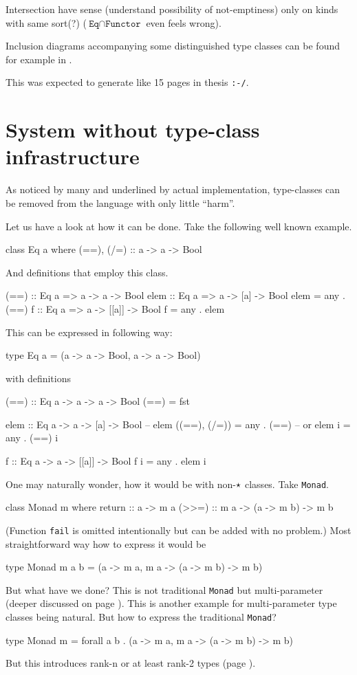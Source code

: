 \documentclass[11pt,oneside,draft]{fithesis2}
\newcommand\uv[1]{``#1''}
\theoremstyle{definition}
\begin{document}
Intersection have sense (understand possibility of not-emptiness) only on
kinds with same sort(?) (\(\texttt{Eq} \cap \texttt{Functor}\) even feels wrong).

Inclusion diagrams accompanying some distinguished type classes can be found for
example in \cite{typeclassopedia}.

This was expected to generate like 15 pages in thesis \verb~:-/~.

\section{System without type-class infrastructure}

As noticed by many and underlined by actual implementation, type-classes can be removed
from the language with only little \uv{harm}.

Let us have a look at how it can be done. Take the following well known example.
\begin{code}
class Eq a where
    (==), (/=) :: a -> a -> Bool
\end{code}
And definitions that employ this class.
\begin{code}
(==) :: Eq a => a -> a -> Bool
elem :: Eq a => a -> [a] -> Bool
elem = any . (==)
f :: Eq a => a -> [[a]] -> Bool
f = any . elem
\end{code}
This can be expressed in following way:
\begin{code}
type Eq a = (a -> a -> Bool, a -> a -> Bool)
\end{code}
with definitions
\begin{code}
(==) :: Eq a -> a -> a -> Bool
(==) = fst

elem :: Eq a -> a -> [a] -> Bool
-- elem ((==), (/=)) = any . (==)
-- or
elem i = any . (==) i

f :: Eq a -> a -> [[a]] -> Bool
f i = any . elem i
\end{code}

One may naturally wonder, how it would be with non-\(\star\) classes.
Take \texttt{Monad}.
\begin{code}
class Monad m where
	return :: a -> m a
	(>>=) :: m a -> (a -> m b) -> m b
\end{code}
(Function \texttt{fail} is omitted intentionally but can be added with
no problem.)
Most straightforward way how to express it would be
\begin{code}
type Monad m a b = (a -> m a, m a -> (a -> m b) -> m b)
\end{code}
But what have we done? This is not traditional \texttt{Monad}
but multi-parameter (deeper discussed on page
\pageref{extension:multiparam}). This is another example for
multi-parameter type classes being natural. But how to express the
traditional \texttt{Monad}?
\begin{code}
type Monad m = forall a b . (a -> m a, m a -> (a -> m b) -> m b)
\end{code}
But this introduces rank-n or at least rank-2 types (page
\pageref{extension:rankn}).
\end{document}

